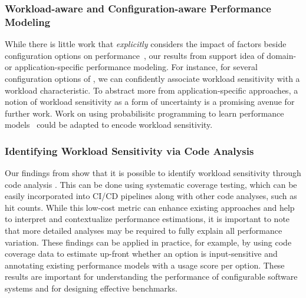 {{{\subsubsection{Workload-aware and Configuration-aware Performance Modeling} While there is little work that \textit{explicitly} considers the impact of factors beside configuration options on performance~\cite{koc_satune_2021}, our results from  support idea of domain- or application-specific performance modeling. For instance, for several configuration options of \jumper, we can confidently associate workload sensitivity with a workload characteristic. To abstract more from application-specific approaches, a notion of workload sensitivity as a form of uncertainty is a promising avenue for further work. Work on using probabilisitc programming to learn performance models~\cite{dorn2020} could be adapted to encode workload sensitivity.


\subsubsection{Identifying Workload Sensitivity via Code Analysis}
Our findings from  show that it is possible to identify workload sensitivity through code analysis . This can be done using systematic coverage testing, which can be easily incorporated into CI/CD pipelines along with other code analyses, such as hit counts. While this low-cost metric can enhance existing approaches and help to interpret and contextualize performance estimations, it is important to note that more detailed analyses may be required to fully explain all performance variation.
These findings can be applied in practice, for example, by using code coverage data to estimate up-front whether an option is input-sensitive and annotating existing performance models with a usage score per option. These results are important for understanding the performance of configurable software systems and for designing effective benchmarks.



}}}
